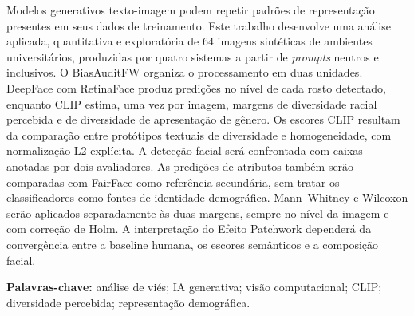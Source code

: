 Modelos generativos texto-imagem podem repetir padrões de representação presentes em seus dados de treinamento. Este trabalho desenvolve uma análise aplicada, quantitativa e exploratória de 64 imagens sintéticas de ambientes universitários, produzidas por quatro sistemas a partir de \textit{prompts} neutros e inclusivos. O BiasAuditFW organiza o processamento em duas unidades. DeepFace com RetinaFace produz predições no nível de cada rosto detectado, enquanto CLIP estima, uma vez por imagem, margens de diversidade racial percebida e de diversidade de apresentação de gênero. Os escores CLIP resultam da comparação entre protótipos textuais de diversidade e homogeneidade, com normalização L2 explícita. A detecção facial será confrontada com caixas anotadas por dois avaliadores. As predições de atributos também serão comparadas com FairFace como referência secundária, sem tratar os classificadores como fontes de identidade demográfica. Mann--Whitney e Wilcoxon serão aplicados separadamente às duas margens, sempre no nível da imagem e com correção de Holm. A interpretação do Efeito Patchwork dependerá da convergência entre a baseline humana, os escores semânticos e a composição facial.

\noindent\textbf{Palavras-chave:} análise de viés; IA generativa; visão computacional; CLIP; diversidade percebida; representação demográfica.
